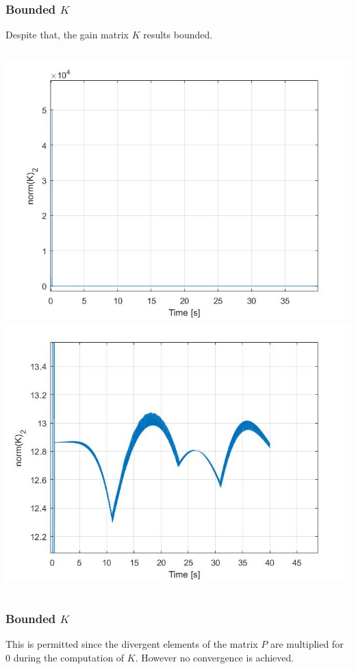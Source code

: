 \documentclass{beamer}
\begin{document}
	\begin{frame}
		\frametitle{Bounded $K$}
		Despite that, the gain matrix $K$ results bounded.
		\begin{columns}[t]
			\centering
			\includegraphics[scale=0.25]{kric}\\
			\centering
			\includegraphics[scale=0.25]{kric2}\\
		\end{columns}
	\end{frame}
	
	\begin{frame}
		\frametitle{Bounded $K$}
		This is permitted since the divergent elements of the matrix $P$ are multiplied for $0$ during the computation of $K$. However no convergence is achieved.\\
	\end{frame}	
	
\end{document}
